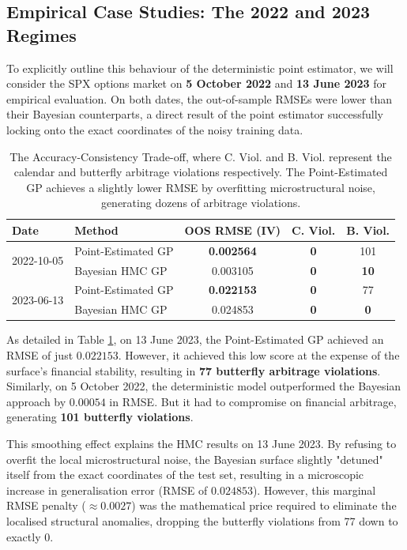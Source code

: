 \documentclass[12pt,oneside]{report}
\theoremstyle{definition}
\theoremstyle{remark}
\begin{document}
\subsection{Empirical Case Studies: The 2022 and 2023 Regimes}
To explicitly outline this behaviour of the deterministic point estimator, we will consider the SPX options market on \textbf{5 October 2022} and \textbf{13 June 2023} for empirical evaluation. On both dates, the out-of-sample RMSEs were lower than their Bayesian counterparts, a direct result of the point estimator successfully locking onto the exact coordinates of the noisy training data.

\begin{table}[htbp]
    \centering
    \begin{tabular}{llccc}
        \toprule
        \textbf{Date} & \textbf{Method} & \textbf{OOS RMSE (IV)} & \textbf{C. Viol.} & \textbf{B. Viol.} \\
        \midrule
        \multirow{2}{*}{2022-10-05} & Point-Estimated GP & \textbf{0.002564} & \textbf{0} & 101 \\
                                    & Bayesian HMC GP    & 0.003105 & \textbf{0} & \textbf{10}  \\
        \midrule
        \multirow{2}{*}{2023-06-13} & Point-Estimated GP & \textbf{0.022153} & \textbf{0} & 77 \\
                                    & Bayesian HMC GP    & 0.024853 & \textbf{0} & \textbf{0}  \\
        \bottomrule
    \end{tabular}
    \caption{The Accuracy-Consistency Trade-off, where C. Viol. and B. Viol. represent the calendar and butterfly arbitrage violations respectively. The Point-Estimated GP achieves a slightly lower RMSE by overfitting microstructural noise, generating dozens of arbitrage violations.}
    \label{tab:accuracy_consistency_tradeoff}
\end{table}

As detailed in Table \ref{tab:accuracy_consistency_tradeoff}, on 13 June 2023, the Point-Estimated GP achieved an RMSE of just $0.022153$. However, it achieved this low score at the expense of the surface's financial stability, resulting in \textbf{77 butterfly arbitrage violations}. Similarly, on 5 October 2022, the deterministic model outperformed the Bayesian approach by $0.00054$ in RMSE. But it had to compromise on financial arbitrage, generating  \textbf{101 butterfly violations}.

This smoothing effect explains the HMC results on 13 June 2023. By refusing to overfit the local microstructural noise, the Bayesian surface slightly "detuned" itself from the exact coordinates of the test set, resulting in a microscopic increase in generalisation error (RMSE of $0.024853$). However, this marginal RMSE penalty ($\approx 0.0027$) was the mathematical price required to eliminate the localised structural anomalies, dropping the butterfly violations from 77 down to exactly 0.
\end{document}
